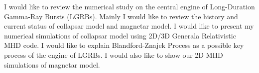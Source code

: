 


\bigskip



\bigskip

\noindent I would like to review the numerical study on the central engine of Long-Duration Gamma-Ray Bursts (LGRBs). Mainly I would like to review the history and current status of collapsar model and magnetar model. I would like to present my numerical simulations of collapsar model using 2D/3D Generala Relativistic MHD code. I would like to explain Blandford-Znajek Process as a possible key process of the engine of LGRBs. I would also like to show our 2D MHD simulations of magnetar model.

